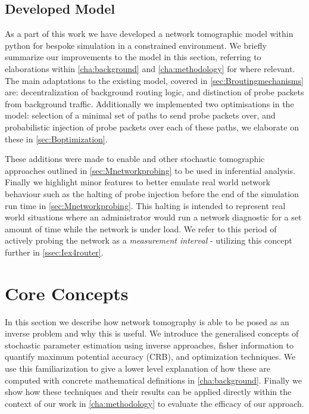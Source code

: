 \subsection{Developed Model}
\label{ssec:Idevelopedmodels}
As a part of this work we have developed a network tomographic model within python for bespoke simulation in a constrained environment. We briefly summarize our improvements to the model in this section, referring to elaborations within \cref{cha:background} and \cref{cha:methodology} for where relevant. The main adaptations to the existing model, covered in \cref{sec:Broutingmechanisms} are: decentralization of background routing logic, and distinction of probe packets from background traffic. Additionally we implemented two optimisations in the model: selection of a minimal set of paths to send probe packets over, and probabilistic injection of probe packets over each of these paths, we elaborate on these in \cref{sec:Boptimization}.\par
These additions were made to enable \pdv and other stochastic tomographic approaches outlined in \cref{sec:Mnetworkprobing} to be used in inferential analysis. Finally we highlight minor features to better emulate real world network behaviour such as the halting of probe injection before the end of the simulation run time in \cref{sec:Mnetworkprobing}. This halting is intended to represent real world situations where an administrator would run a network diagnostic for a set amount of time while the network is under load. We refer to this period of actively probing the network as a \textit{measurement interval} - utilizing this concept further in \cref{ssec:Iex4router}.

\section{Core Concepts}
\label{sec:Icoreconcepts}

In this section we describe how network tomography is able to be posed as an inverse problem and why this is useful. We introduce the generalised concepts of stochastic parameter estimation using inverse approaches, fisher information to quantify maximum potential accuracy (CRB), and optimization techniques. We use this familiarization to give a lower level explanation of how these are computed with concrete mathematical definitions in \cref{cha:background}. Finally we show how these techniques and their results can be applied directly within the context of our work in \cref{cha:methodology} to evaluate the efficacy of our approach.

